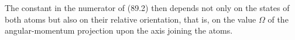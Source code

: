 The constant in the numerator of (89.2) then depends not only on the states of both atoms but also on their relative orientation, that is, on the value $\Omega$ of the angular-momentum projection upon the axis joining the atoms.

